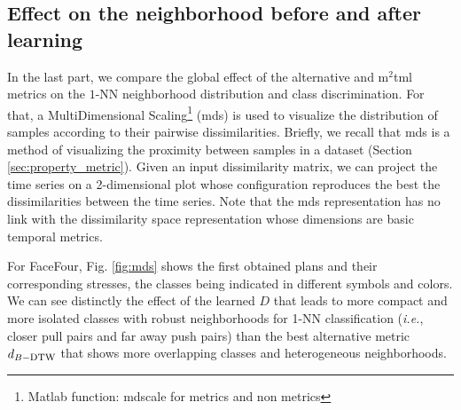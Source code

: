 \newpage
\subsection{Effect on the neighborhood before and after learning}
In the last part, we compare the global effect of the alternative and {\sc m}$^2${\sc tml} metrics  on the $1$-NN neighborhood distribution and class discrimination. For that, a MultiDimensional Scaling\footnote{Matlab function: mdscale for metrics and non metrics} ({\sc mds}) is used to visualize the distribution of samples according to their pairwise  dissimilarities. Briefly, we recall that {\sc mds} is a method of visualizing the proximity between samples in a dataset (Section \ref{sec:property_metric}). Given an input dissimilarity matrix, we can project the time series on a 2-dimensional plot whose configuration reproduces the best the dissimilarities between the time series. Note that the {\sc mds} representation has no link with the dissimilarity space representation whose dimensions are basic temporal metrics.

For FaceFour, Fig. \ref{fig:mds} shows the first obtained plans and their corresponding stresses, the classes being indicated in different symbols and colors. We can see distinctly the effect of the learned  $D$ that leads to  more compact and more isolated classes with  robust  neighborhoods for 1-NN classification ({\it i.e.}, closer pull pairs and far away push pairs) than  the best alternative metric $d_{B-\mbox{\sc dtw}}$ that shows more overlapping classes and heterogeneous neighborhoods.

